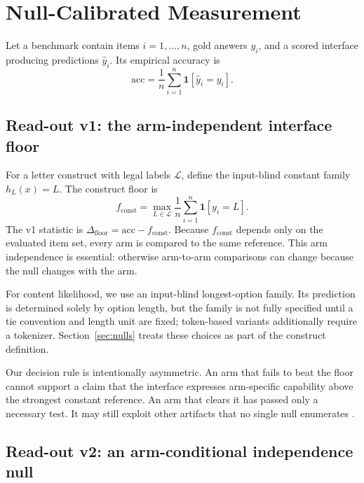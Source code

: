 \section{Null-Calibrated Measurement}

Let a benchmark contain items $i=1,\ldots,n$, gold answers $y_{i}$, and a scored interface producing predictions $\hat{y}_{i}$. Its empirical accuracy is
\begin{equation}
    \mathrm{acc}=\frac{1}{n}\sum_{i=1}^{n}\mathbf{1}[\hat{y}_{i}=y_{i}].
\end{equation}

\subsection{Read-out v1: the arm-independent interface floor}

For a letter construct with legal labels $\mathcal{L}$, define the input-blind constant family $h_{L}(x)=L$. The construct floor is
\begin{equation}
    f_{\mathrm{const}}=\max_{L\in\mathcal{L}}\frac{1}{n}\sum_{i=1}^{n}\mathbf{1}[y_{i}=L].
\end{equation}
The v1 statistic is $\Delta_{\mathrm{floor}}=\mathrm{acc}-f_{\mathrm{const}}$. Because $f_{\mathrm{const}}$ depends only on the evaluated item set, every arm is compared to the same reference. This arm independence is essential: otherwise arm-to-arm comparisons can change because the null changes with the arm.

For content likelihood, we use an input-blind longest-option family. Its prediction is determined solely by option length, but the family is not fully specified until a tie convention and length unit are fixed; token-based variants additionally require a tokenizer. Section~\ref{sec:nulls} treats these choices as part of the construct definition.

Our decision rule is intentionally asymmetric. An arm that fails to beat the floor cannot support a claim that the interface expresses arm-specific capability above the strongest constant reference. An arm that clears it has passed only a necessary test. It may still exploit other artifacts that no single null enumerates \citep{feng2019misleading}.

\subsection{Read-out v2: an arm-conditional independence null}
\label{sec:v2}

